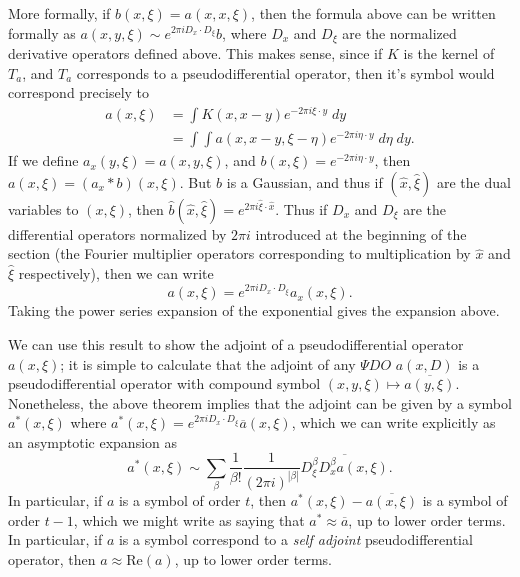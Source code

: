 \begin{remark}
    More formally, if $b(x,\xi) = a(x,x,\xi)$, then the formula above can be written formally as $a(x,y,\xi) \sim e^{2 \pi i D_x \cdot D_\xi} b$, where $D_x$ and $D_\xi$ are the normalized derivative operators defined above. This makes sense, since if $K$ is the kernel of $T_a$, and $T_a$ corresponds to a pseudodifferential operator, then it's symbol would correspond precisely to
    \begin{align*}
        a(x,\xi) &= \int K(x, x - y) e^{-2 \pi i \xi \cdot y}\; dy\\
        &= \int \int a(x,x-y,\xi-\eta) e^{- 2 \pi i \eta \cdot y}\; d\eta\; dy.
    \end{align*}
    If we define $a_x(y,\xi) = a(x,y,\xi)$, and $b(x,\xi) = e^{-2 \pi i \eta \cdot y}$, then $a(x,\xi) = (a_x * b)(x,\xi)$. But $b$ is a Gaussian, and thus if $(\widehat{x}, \widehat{\xi})$ are the dual variables to $(x,\xi)$, then $\widehat{b}(\widehat{x}, \widehat{\xi}) = e^{2 \pi i \widehat{\xi} \cdot \widehat{x}}$. Thus if $D_x$ and $D_\xi$ are the differential operators normalized by $2\pi i$ introduced at the beginning of the section (the Fourier multiplier operators corresponding to multiplication by $\widehat{x}$ and $\widehat{\xi}$ respectively), then we can write
    \[ a(x,\xi) = e^{2 \pi i D_x \cdot D_\xi} a_x(x,\xi). \]
    Taking the power series expansion of the exponential gives the expansion above.
\end{remark}

We can use this result to show the adjoint of a pseudodifferential operator $a(x,\xi)$; it is simple to calculate that the adjoint of any $\Psi DO$ $a(x,D)$ is a pseudodifferential operator with compound symbol $(x,y,\xi) \mapsto \overline{a(y,\xi)}$. Nonetheless, the above theorem implies that the adjoint can be given by a symbol $a^*(x,\xi)$ where $a^*(x,\xi) = e^{2 \pi i D_x \cdot D_\xi} \overline{a}(x,\xi)$, which we can write explicitly as an asymptotic expansion as
%
\[ a^*(x,\xi) \sim \sum_\beta \frac{1}{\beta!} \frac{1}{(2 \pi i)^{|\beta|}} \overline{D^\beta_\xi D^\beta_x a(x,\xi)}. \]
%
In particular, if $a$ is a symbol of order $t$, then $a^*(x,\xi) - \overline{a(x,\xi)}$ is a symbol of order $t - 1$, which we might write as saying that $a^* \approx \overline{a}$, up to lower order terms. In particular, if $a$ is a symbol correspond to a \emph{self adjoint} pseudodifferential operator, then $a \approx \text{Re}(a)$, up to lower order terms.

